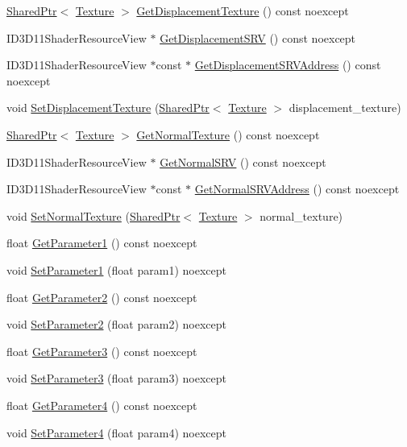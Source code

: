 \begin{DoxyCompactItemize}
\item 
\hyperlink{namespacemage_a1e01ae66713838a7a67d30e44c67703e}{Shared\+Ptr}$<$ \hyperlink{classmage_1_1_texture}{Texture} $>$ \hyperlink{structmage_1_1_material_ab548fbf5844ae7cd2822304ef7fb9602}{Get\+Displacement\+Texture} () const noexcept
\item 
I\+D3\+D11\+Shader\+Resource\+View $\ast$ \hyperlink{structmage_1_1_material_a638ee0913aa0722f499c883b71549503}{Get\+Displacement\+S\+RV} () const noexcept
\item 
I\+D3\+D11\+Shader\+Resource\+View $\ast$const  $\ast$ \hyperlink{structmage_1_1_material_a7672015b558ebbaa52e070f65b052b2e}{Get\+Displacement\+S\+R\+V\+Address} () const noexcept
\item 
void \hyperlink{structmage_1_1_material_ab9c90afa999906a3ad33c8a8da13da24}{Set\+Displacement\+Texture} (\hyperlink{namespacemage_a1e01ae66713838a7a67d30e44c67703e}{Shared\+Ptr}$<$ \hyperlink{classmage_1_1_texture}{Texture} $>$ displacement\+\_\+texture)
\item 
\hyperlink{namespacemage_a1e01ae66713838a7a67d30e44c67703e}{Shared\+Ptr}$<$ \hyperlink{classmage_1_1_texture}{Texture} $>$ \hyperlink{structmage_1_1_material_a7343766b10456e4ed1e09b3fe6110981}{Get\+Normal\+Texture} () const noexcept
\item 
I\+D3\+D11\+Shader\+Resource\+View $\ast$ \hyperlink{structmage_1_1_material_a0be98911c56dedaa4fd2f8714fc8a793}{Get\+Normal\+S\+RV} () const noexcept
\item 
I\+D3\+D11\+Shader\+Resource\+View $\ast$const  $\ast$ \hyperlink{structmage_1_1_material_a297911bb366b1cc1b28d0c35353eb806}{Get\+Normal\+S\+R\+V\+Address} () const noexcept
\item 
void \hyperlink{structmage_1_1_material_a61b695303632bd8fd1399c63e746319e}{Set\+Normal\+Texture} (\hyperlink{namespacemage_a1e01ae66713838a7a67d30e44c67703e}{Shared\+Ptr}$<$ \hyperlink{classmage_1_1_texture}{Texture} $>$ normal\+\_\+texture)
\item 
float \hyperlink{structmage_1_1_material_af6862d7f8fd561e7979bda46449f319f}{Get\+Parameter1} () const noexcept
\item 
void \hyperlink{structmage_1_1_material_a350e145990c73b08e7e2bda2a4255e88}{Set\+Parameter1} (float param1) noexcept
\item 
float \hyperlink{structmage_1_1_material_a078d5b29bd1262fae5052989c6d4ca8b}{Get\+Parameter2} () const noexcept
\item 
void \hyperlink{structmage_1_1_material_a7a1f7dbc0b3b3c72e87a3be0c17f825a}{Set\+Parameter2} (float param2) noexcept
\item 
float \hyperlink{structmage_1_1_material_ad802d2958227950f82ba838d61490b63}{Get\+Parameter3} () const noexcept
\item 
void \hyperlink{structmage_1_1_material_ae79a7b52c3c2ac2b6038276493d09f11}{Set\+Parameter3} (float param3) noexcept
\item 
float \hyperlink{structmage_1_1_material_a192dd5d9836fc12974dbaa820ca90dd2}{Get\+Parameter4} () const noexcept
\item 
void \hyperlink{structmage_1_1_material_a964eddafac7f3cab4bae60ed6c8429f2}{Set\+Parameter4} (float param4) noexcept
\end{DoxyCompactItemize}
